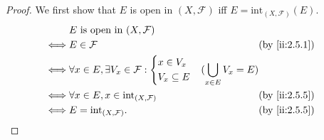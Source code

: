 \begin{proof}
  We first show that \(E\) is open in \((X, \mathcal{F})\) iff \(E = \text{int}_{(X, \mathcal{F})}(E)\).
  \begin{align*}
         & E \text{ is open in } (X, \mathcal{F})                                                                      \\
    \iff & E \in \mathcal{F}                                             &                             & \by{ii:2.5.1} \\
    \iff & \forall x \in E, \exists V_x \in \mathcal{F} : \begin{dcases}
                                                            x \in V_x \\
                                                            V_x \subseteq E
                                                          \end{dcases} & (\bigcup_{x \in E} V_x = E)                   \\
    \iff & \forall x \in E, x \in \text{int}_{(X, \mathcal{F})}          &                             & \by{ii:2.5.5} \\
    \iff & E = \text{int}_{(X, \mathcal{F})}.                            &                             & \by{ii:2.5.5}
  \end{align*}


\end{proof}
